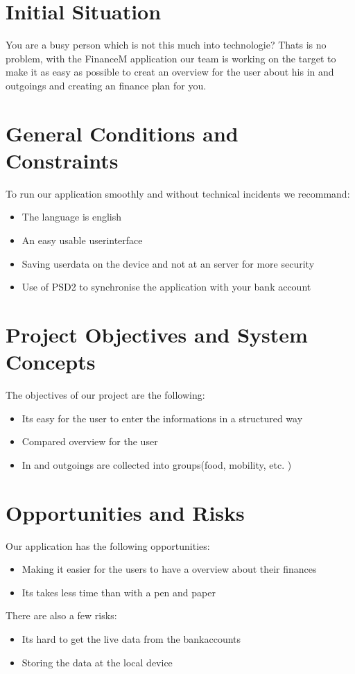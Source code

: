 \documentclass[12pt]{article}
\theoremstyle{definition}
\begin{document}
\section{Initial Situation}

You are a busy person which is not this much into technologie?
Thats is no problem, with the FinanceM application our team is working on the target to make it as easy as possible to creat an overview for the user about his in and outgoings and creating an finance plan for you.

\pagebreak

\section{General Conditions and Constraints}

To run our application smoothly and without technical incidents we recommand:
\begin{itemize}
	\item The language is english
	\item An easy usable userinterface
	\item Saving userdata on the device and not at an server for more security
	\item Use of PSD2 to synchronise the application with your bank account
\end{itemize}

\pagebreak

\section{Project Objectives and System Concepts}

The objectives of our project are the following:
\begin{itemize}
\item Its easy for the user to enter the informations in a structured way
\item Compared overview for the user
\item In and outgoings are collected into groups(food, mobility, etc. )
\end{itemize}

\pagebreak
\section{Opportunities and Risks}

Our application has the following opportunities:
\begin{itemize}
\item Making it easier for the users to have a overview about their finances
\item Its takes less time than with a pen and paper
\end{itemize}
There are also a few risks:
\begin{itemize}
	\item Its hard to get the live data from the bankaccounts
	\item Storing the data at the local device
\end{itemize}
\end{document}
